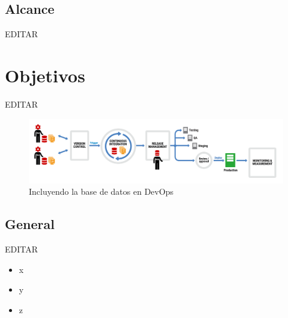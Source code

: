 \documentclass[preprint,12pt]{elsarticle}
\begin{document}

\subsection {\textbf{Alcance}}

EDITAR\\



\section{Objetivos}

EDITAR\\

\begin{figure}[htb]
	\begin{center}
		\includegraphics[width=14cm]{./IMAGENES/basededatos_1} 
		\caption{Incluyendo la base de datos en DevOps}
	\end{center}
\end{figure}


\subsection{\textbf{General}}

EDITAR\\

\begin{itemize}

\item x
\item y
\item z

\end{itemize}

\end{document}
